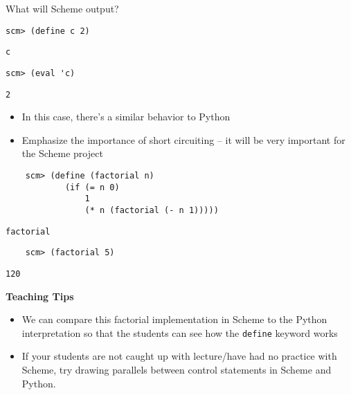 \begin{blocksection}
\question What will Scheme output?

\begin{lstlisting}
scm> (define c 2)
\end{lstlisting}
\begin{solution}[0.25in]
\begin{lstlisting}
c
\end{lstlisting}
\end{solution}

\begin{lstlisting}
scm> (eval 'c)
\end{lstlisting}
\begin{solution}[0.25in]
\begin{lstlisting}
2
\end{lstlisting}
\end{solution}

\begin{guide}
	\begin{itemize}
	\item In this case, there's a similar behavior to Python
	\item Emphasize the importance of short circuiting -- it will be very important for the Scheme project
	\end{itemize}
\end{guide}
\begin{blocksection}
	\begin{lstlisting}
	scm> (define (factorial n)
			(if (= n 0)
				1
				(* n (factorial (- n 1)))))
	\end{lstlisting}
	\begin{solution}[.25in]
	\texttt{factorial}
	\end{solution}
	
	\begin{lstlisting}
	scm> (factorial 5)
	\end{lstlisting}
	\begin{solution}[.25in]
	\texttt{120}
	\end{solution}
\end{blocksection}

\begin{guide}
	\begin{blocksection}
	\textbf{Teaching Tips}
	\begin{itemize}
	  \item We can compare this factorial implementation in Scheme to the Python interpretation so that the students can see how the \lstinline{define} keyword works
	  \item If your students are not caught up with lecture/have had no practice with Scheme, try drawing parallels between control statements in Scheme and Python.
	\end{itemize}
	\end{blocksection}
\end{guide}



\end{blocksection}
